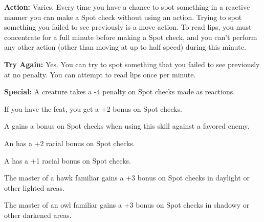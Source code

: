 \textbf{Action:} Varies. Every time you have a chance to spot something in a reactive 
manner you can make a Spot check without using an action. Trying to spot something 
you failed to see previously is a move action. To read lips, you must concentrate 
for a full minute before making a Spot check, and you can't perform any other action 
(other than moving at up to half speed) during this minute.

\textbf{Try Again:} Yes. You can try to spot something that you failed to see previously 
at no penalty. You can attempt to read lips once per minute.

\textbf{Special:} A  creature takes a -4 penalty on Spot checks made 
as reactions.

If you have the  feat, you get a +2 bonus on Spot checks.

A  gains a bonus on Spot checks when using this skill against a favored enemy.

An  has a +2 racial bonus on Spot checks.

A  has a +1 racial bonus on Spot checks.

The master of a hawk familiar gains a +3 bonus on Spot checks in daylight or other 
lighted areas.

The master of an owl familiar gains a +3 bonus on Spot checks in shadowy or other 
darkened areas.
